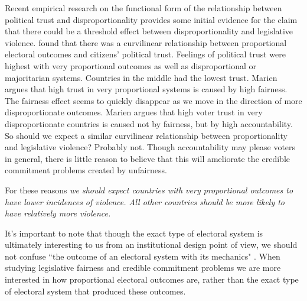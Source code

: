 \documentclass[a4paper]{article}\usepackage[]{graphicx}\usepackage[]{color}
\begin{document}
Recent empirical research on the functional form of the relationship between political trust and disproportionality provides some initial evidence for the claim that there could be a threshold effect between disproportionality and legislative violence. \cite{Marien2011} found that there was a curvilinear relationship between proportional electoral outcomes and citizens' political trust. Feelings of political trust were highest with very proportional outcomes as well as disproportional or majoritarian systems. Countries in the middle had the lowest trust. Marien argues that high trust in very proportional systems is caused by high fairness. The fairness effect seems to quickly disappear as we move in the direction of more disproportionate outcomes. Marien argues that high voter trust in very disproportionate countries is caused not by fairness, but by high accountability. So should we expect a similar curvilinear relationship between proportionality and legislative violence? Probably not. Though accountability may please voters in general, there is little reason to believe that this will ameliorate the credible commitment problems created by unfairness.

For these reasons \emph{we should expect countries with very proportional outcomes to have lower incidences of violence. All other countries should be more likely to have relatively more violence.} 

It's important to note that though the exact type of electoral system is ultimately interesting to us from an institutional design point of view, we should not confuse ``the outcome of an electoral system with its mechanics" \citep[][109]{Golder2005}. When studying legislative fairness and credible commitment problems we are more interested in how proportional electoral outcomes are, rather than the exact type of electoral system that produced these outcomes. 
\end{document}
